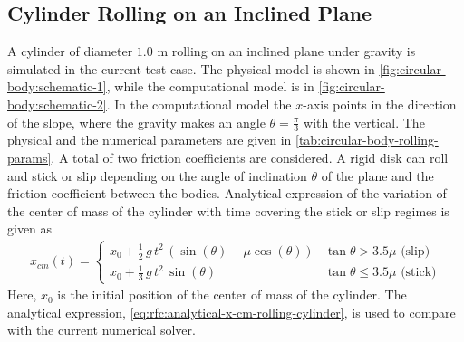 \subsection{Cylinder Rolling on an Inclined Plane}
\label{sec:cylinder-rolling-on-an-inclined-plane}
A cylinder of diameter $1.0$ m rolling on an inclined plane under gravity is
simulated in the current test case. The physical model is shown in
\cref{fig:circular-body:schematic-1}, while the computational model is in
\cref{fig:circular-body:schematic-2}. In the computational model the $x$-axis
points in the direction of the slope, where the gravity makes an angle
$\theta=\frac{\pi}{3}$ with the vertical. The physical and the numerical
parameters are given in \cref{tab:circular-body-rolling-params}. A total of two
friction coefficients are considered. A rigid disk can roll and stick or slip
depending on the angle of inclination $\theta$ of the plane and the friction
coefficient between the bodies. Analytical expression of the variation of the
center of mass of the cylinder with time covering the stick or slip regimes is
given as
\begin{align}
  \label{eq:rfc:analytical-x-cm-rolling-cylinder}
  x_{cm}(t) =
  \begin{cases}
  x_0 + \frac{1}{2} \, g \, t^2 \, (\sin(\theta) - \mu \cos(\theta)) & \tan{\theta} > 3.5\mu \text{ (slip)}\\
  x_0 + \frac{1}{3} \, g \, t^2 \, \sin(\theta) & \tan{\theta} \leq 3.5\mu \text{ (stick)}
\end{cases}
\end{align}
Here, $x_0$ is the initial position of the center of mass of the cylinder. The
analytical expression, \cref{eq:rfc:analytical-x-cm-rolling-cylinder}, is used
to compare with the current numerical solver.
